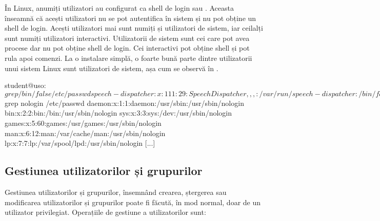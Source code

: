 În Linux, anumiți utilizatori au configurat ca shell de login  sau
. Aceasta înseamnă că acești utilizatori nu se pot autentifica în
sistem și nu pot obține un shell de login. Acești utilizatori mai sunt numiți și
utilizatori de sistem, iar ceilalți sunt numiți utilizatori interactivi.
Utilizatorii de sistem sunt cei care pot avea procese dar nu pot obține shell de
login. Cei interactivi pot obține shell și pot rula apoi comenzi. La o instalare
simplă, o foarte bună parte dintre utilizatorii unui sistem Linux sunt
utilizatori de sistem, așa cum se observă în .

\begin{screen}[caption={Afișarea utilizatorilor de sistem},label={lst:user:system-users}]
student@uso:~$ grep /bin/false /etc/passwd
speech-dispatcher:x:111:29:Speech Dispatcher,,,:/var/run/speech-dispatcher:/bin/false
whoopsie:x:112:117::/nonexistent:/bin/false
hplip:x:118:7:HPLIP system user,,,:/var/run/hplip:/bin/false
gnome-initial-setup:x:120:65534::/run/gnome-initial-setup/:/bin/false
gdm:x:121:125:Gnome Display Manager:/var/lib/gdm3:/bin/false
vboxadd:x:999:1::/var/run/vboxadd:/bin/false

student@uso:~$ grep nologin /etc/passwd
daemon:x:1:1:daemon:/usr/sbin:/usr/sbin/nologin
bin:x:2:2:bin:/bin:/usr/sbin/nologin
sys:x:3:3:sys:/dev:/usr/sbin/nologin
games:x:5:60:games:/usr/games:/usr/sbin/nologin
man:x:6:12:man:/var/cache/man:/usr/sbin/nologin
lp:x:7:7:lp:/var/spool/lpd:/usr/sbin/nologin
[...]
\end{screen}

\subsection{Gestiunea utilizatorilor și grupurilor}
\label{sec:user:groups}

Gestiunea utilizatorilor și grupurilor, însemnând crearea, ștergerea sau
modificarea utilizatorilor și grupurilor poate fi făcută, în mod normal, doar de
un utilizator privilegiat. Operațiile de gestiune a utilizatorilor sunt:

